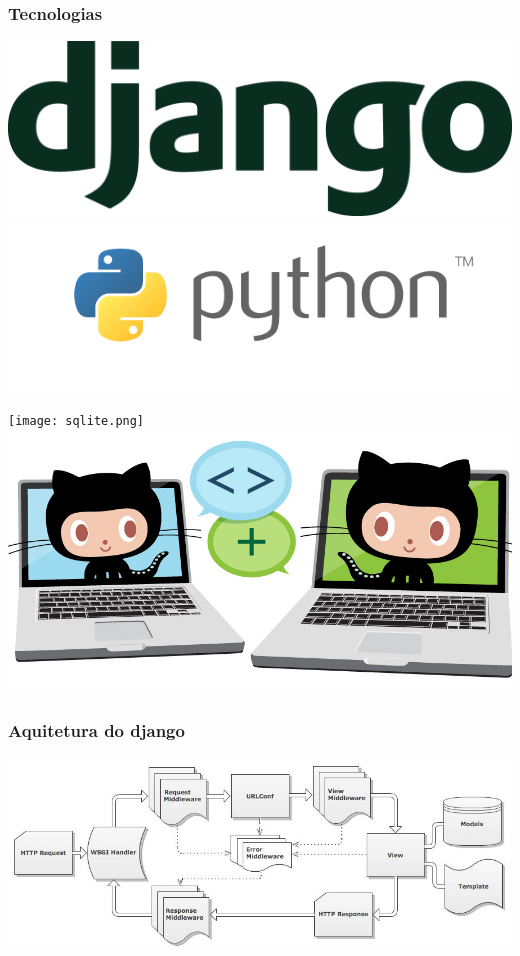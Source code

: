 \documentclass{beamer}
\begin{document}
\begin{frame}
  \frametitle{Tecnologias}
  \includegraphics[width=.5\textwidth]{django.png}
  \includegraphics[width=.5\textwidth]{python.png}
  
  \centerline{
    \texttt{[image: sqlite.png]}
    \includegraphics[width=.5\textwidth]{github.jpg}
  }
\end{frame}

\begin{frame}
  \frametitle{Aquitetura do django}
  \includegraphics[width=\textwidth]{arquitetura.jpg}
\end{frame}
\end{document}
